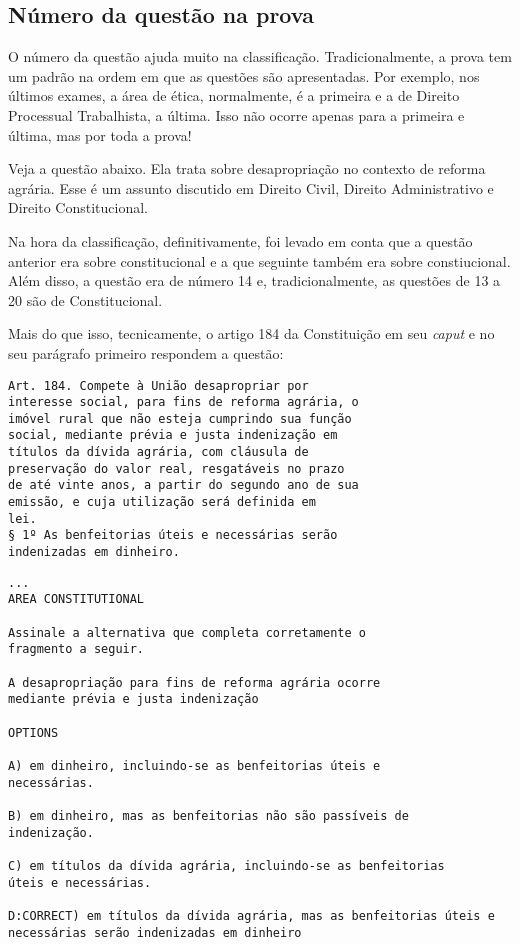 \documentclass{article}
\begin{document}
\subsection{Número da questão na prova}

O número da questão ajuda muito na classificação. Tradicionalmente, a
prova tem um padrão na ordem em que as questões são apresentadas. Por
exemplo, nos últimos exames, a área de ética, normalmente, é a
primeira e a de Direito Processual Trabalhista, a última. Isso não
ocorre apenas para a primeira e última, mas por toda a prova!

Veja a questão abaixo. Ela trata sobre desapropriação no contexto de
reforma agrária. Esse é um assunto discutido em Direito Civil, Direito
Administrativo e Direito Constitucional.

Na hora da classificação, definitivamente, foi levado em conta que a
questão anterior era sobre constitucional e a que seguinte também era
sobre constiucional. Além disso, a questão era de número 14 e,
tradicionalmente, as questões de 13 a 20 são de Constitucional.

Mais do que isso, tecnicamente, o artigo 184 da Constituição em seu
\textit{caput} e no seu parágrafo primeiro respondem a questão:

\begin{verbatim}
Art. 184. Compete à União desapropriar por
interesse social, para fins de reforma agrária, o
imóvel rural que não esteja cumprindo sua função
social, mediante prévia e justa indenização em
títulos da dívida agrária, com cláusula de
preservação do valor real, resgatáveis no prazo
de até vinte anos, a partir do segundo ano de sua
emissão, e cuja utilização será definida em
lei.
§ 1º As benfeitorias úteis e necessárias serão
indenizadas em dinheiro.
\end{verbatim}


\begin{verbatim}
...
AREA CONSTITUTIONAL
  
Assinale a alternativa que completa corretamente o 
fragmento a seguir. 

A desapropriação para fins de reforma agrária ocorre 
mediante prévia e justa indenização  

OPTIONS 

A) em dinheiro, incluindo-se as benfeitorias úteis e 
necessárias. 

B) em dinheiro, mas as benfeitorias não são passíveis de 
indenização. 

C) em títulos da dívida agrária, incluindo-se as benfeitorias 
úteis e necessárias. 

D:CORRECT) em títulos da dívida agrária, mas as benfeitorias úteis e 
necessárias serão indenizadas em dinheiro
\end{verbatim}
\end{document}

